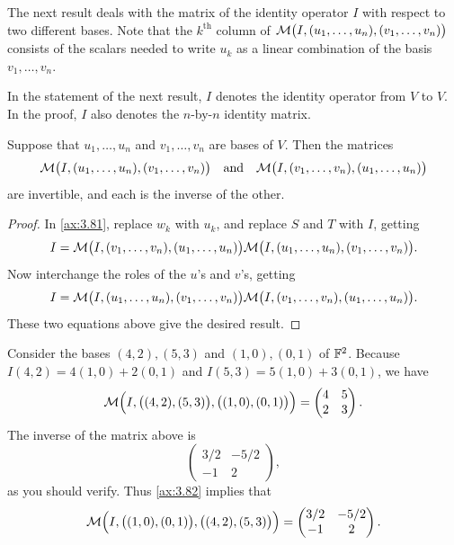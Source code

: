 The next result deals with the matrix of the identity operator $I$ with respect
to two different bases. Note that the $k^{\text{th}}$ column of
$\mathcal{M}\bigl(I,(u_1,\dots,u_n),(v_1,\dots,v_n)\bigr)$ consists of the scalars
needed to write $u_k$ as a linear combination of the basis $v_1,\dots,v_n$.

In the statement of the next result, $I$ denotes the identity operator from $V$
to $V$. In the proof, $I$ also denotes the $n$-by-$n$ identity matrix.

\begin{result}\label{ax:3.82}
Suppose that $u_1,\dots,u_n$ and $v_1,\dots,v_n$ are bases of $V$. Then the
matrices
\[ \mathcal{M}\bigl(I,(u_1,\dots,u_n),(v_1,\dots,v_n)\bigr) \quad\text{and}\quad
   \mathcal{M}\bigl(I,(v_1,\dots,v_n),(u_1,\dots,u_n)\bigr) \]
are invertible, and each is the inverse of the other.
\end{result}

\begin{proof}
In \ref{ax:3.81}, replace $w_k$ with $u_k$, and replace $S$ and $T$ with $I$,
getting
\[ I = \mathcal{M}\bigl(I,(v_1,\dots,v_n),(u_1,\dots,u_n)\bigr)
       \mathcal{M}\bigl(I,(u_1,\dots,u_n),(v_1,\dots,v_n)\bigr). \]
Now interchange the roles of the $u$'s and $v$'s, getting
\[ I = \mathcal{M}\bigl(I,(u_1,\dots,u_n),(v_1,\dots,v_n)\bigr)
       \mathcal{M}\bigl(I,(v_1,\dots,v_n),(u_1,\dots,u_n)\bigr). \]
These two equations above give the desired result.
\end{proof}

\begin{example}\label{ax:3.83}
Consider the bases $(4,2),(5,3)$ and $(1,0),(0,1)$ of $\mathbb{F}^2$. Because
$I(4,2)=4(1,0)+2(0,1)$ and $I(5,3)=5(1,0)+3(0,1)$, we have
\[ \mathcal{M}\Bigl(I,\bigl((4,2),(5,3)\bigr),\bigl((1,0),(0,1)\bigr)\Bigr)
   = \begin{pmatrix} 4 & 5\\ 2 & 3 \end{pmatrix}. \]
The inverse of the matrix above is
\[ \begin{pmatrix} 3/2 & -5/2\\ -1 & 2 \end{pmatrix}, \]
as you should verify. Thus \ref{ax:3.82} implies that
\[ \mathcal{M}\Bigl(I,\bigl((1,0),(0,1)\bigr),\bigl((4,2),(5,3)\bigr)\Bigr)
   = \begin{pmatrix} 3/2 & -5/2\\ -1 & 2 \end{pmatrix}. \]
\end{example}

